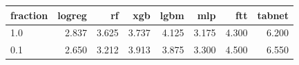 \begin{tabular}{lrrrrrrr}
\toprule
fraction & logreg & rf & xgb & lgbm & mlp & ftt & tabnet \\
\midrule
1.0 & 2.837 & 3.625 & 3.737 & 4.125 & 3.175 & 4.300 & 6.200 \\
0.1 & 2.650 & 3.212 & 3.913 & 3.875 & 3.300 & 4.500 & 6.550 \\
\bottomrule
\end{tabular}
